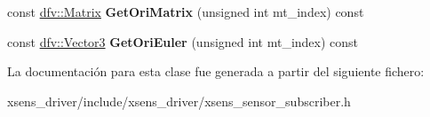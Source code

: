 \begin{DoxyCompactItemize}
\item 
\hypertarget{classxsens_1_1SensorSubscriberList_ae1a5be367372535440fa2c0a9b63503d}{const \hyperlink{classdfv_1_1Matrix}{dfv\-::\-Matrix} {\bfseries \-Get\-Ori\-Matrix} (unsigned int mt\-\_\-index) const }\label{classxsens_1_1SensorSubscriberList_ae1a5be367372535440fa2c0a9b63503d}

\item 
\hypertarget{classxsens_1_1SensorSubscriberList_ad3d9bfb1b707ae157e73039d391f9b14}{const \hyperlink{classdfv_1_1Vector3}{dfv\-::\-Vector3} {\bfseries \-Get\-Ori\-Euler} (unsigned int mt\-\_\-index) const }\label{classxsens_1_1SensorSubscriberList_ad3d9bfb1b707ae157e73039d391f9b14}

\end{DoxyCompactItemize}


\-La documentación para esta clase fue generada a partir del siguiente fichero\-:\begin{DoxyCompactItemize}
\item 
xsens\-\_\-driver/include/xsens\-\_\-driver/xsens\-\_\-sensor\-\_\-subscriber.\-h\end{DoxyCompactItemize}
